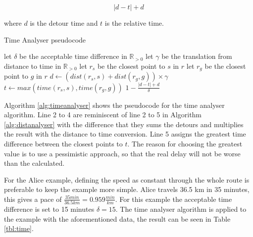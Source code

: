 \[ |d - t| + d \]

where $d$ is the detour time and $t$ is the relative time.

\iffalse
Now, let us consider what would happen on the return route.
The situation is now that the driver and passenger want to return to their original locations, but they want to leave at a specific time.
The algorithm already solves this because if a specific arrival time is defined a specific departure time must also be defined.
And the differences in time must be the same.
\fi

\begin{algorithm}
	\caption{Time Analyser pseudocode}
	\label{alg:timeanalyser}
	\begin{algorithmic}[1]
		\Require 
		\Statex let $\delta$ be the acceptable time difference in $\mathbb{R}_{>0}$
		\Statex let $\gamma$ be the translation from distance to time in $\mathbb{R}_{>0}$ 
		\Statex 
			\State let $r_s$ be the closest point to $s$ in $r$
			\State let $r_g$ be the closest point to $g$ in $r$
			\State $d \gets (dist(r_s,s) + dist(r_g,g))\times\gamma$
			\State $t \gets max(time(r_s, s), time(r_g, g))$
			\State\Return $1-\frac{|d - t| + d}{\delta}$
		\EndFunction
	\end{algorithmic}
\end{algorithm}

Algorithm \ref{alg:timeanalyser} shows the pseudocode for the time analyser algorithm.
Line 2 to 4 are reminiscent of line 2 to 5 in Algorithm \ref{alg:distanalyser} with the difference that they sums the detours and multiplies the result with the distance to time conversion.
Line 5 assigns the greatest time difference between the closest points to $t$.
The reason for choosing the greatest value is to use a pessimistic approach, so that the real delay will not be worse than the calculated.

For the Alice example, defining the speed as constant through the whole route is preferable to keep the example more simple.
Alice travels 36.5 km in 35 minutes, this gives a pace of  $\frac{35 min}{36.5 km} = 0.959\frac{min}{km} $.
For this example the acceptable time difference is set to 15 minutes $\delta = 15$.
The time analyser algorithm is applied to the example with the aforementioned data, the result can be seen in Table \ref{tbl:time}.

